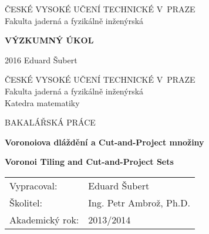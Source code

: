 \documentclass[a4paper,11pt,twoside]{article}
\theoremstyle{definition}
\theoremstyle{remark}
\begin{document}
\thispagestyle{empty}

\begin{center}

{\Large ČESKÉ VYSOKÉ UČENÍ TECHNICKÉ V~PRAZE} \\[3.5mm]
{\Large Fakulta jaderná a fyzikálně inženýrská}


{\Huge\textbf{VÝZKUMNÝ ÚKOL}}


{\Large \hspace*{1cm} 2016 \hfill Eduard Šubert \hspace*{1cm}}

\end{center}

\clearpage
\thispagestyle{empty}
\cleardoublepage

\thispagestyle{empty}

\begin{center}

{\Large ČESKÉ VYSOKÉ UČENÍ TECHNICKÉ V~PRAZE} \\[3.5mm]
{\Large Fakulta jaderná a fyzikálně inženýrská} \\[3.5mm]
{\Large Katedra matematiky}


{\Large BAKALÁŘSKÁ PRÁCE}


{\LARGE
\textbf{Voronoiova dláždění a Cut-and-Project množiny}
\par}

\vspace{1cm}

{\LARGE
\textbf{Voronoi Tiling and Cut-and-Project Sets}
\par}


\end{center}

\begin{tabular}{ll} 
{\Large Vypracoval:} & {\Large Eduard Šubert} \\[1mm]
{\Large \v{S}kolitel:} & {\Large Ing. Petr Ambrož, Ph.D.} \\[2mm]
{\Large Akademický rok:}     & {\Large 2013/2014}
\end{tabular}
\end{document}
